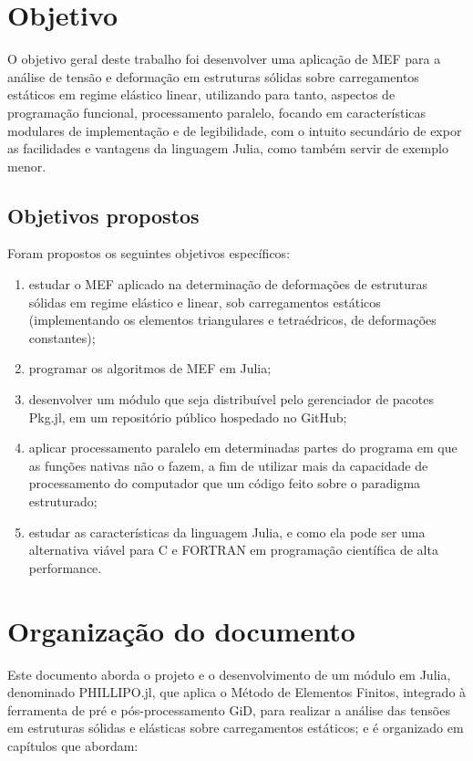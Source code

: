 \section{Objetivo}

O objetivo geral deste trabalho foi desenvolver uma aplicação de MEF para a análise de tensão e deformação em estruturas sólidas sobre carregamentos estáticos em regime elástico linear, utilizando para tanto, aspectos de programação funcional, processamento paralelo, focando em características modulares de implementação e de legibilidade, com o intuito secundário de expor as facilidades e vantagens da linguagem Julia, como também servir de exemplo menor.

\subsection{Objetivos propostos}

Foram propostos os seguintes objetivos específicos:

\begin{enumerate}
    \item estudar o MEF aplicado na determinação de deformações de estruturas sólidas em regime elástico e linear, sob carregamentos estáticos (implementando os elementos triangulares e tetraédricos, de deformações constantes);
    \item programar os algoritmos de MEF em Julia;
    \item desenvolver um módulo que seja distribuível pelo gerenciador de pacotes Pkg.jl, em um repositório público hospedado no GitHub;
    \item aplicar processamento paralelo em determinadas partes do programa em que as funções nativas não o fazem, a fim de utilizar mais da capacidade de processamento do computador que um código feito sobre o paradigma estruturado;
    \item estudar as características da linguagem Julia, e como ela pode ser uma alternativa viável para C e FORTRAN em programação científica de alta performance.
\end{enumerate}

\section{Organização do documento}

Este documento aborda o projeto e o desenvolvimento de um módulo em Julia, denominado PHILLIPO.jl, que aplica o Método de Elementos Finitos, integrado à ferramenta de pré e pós-processamento GiD, para realizar a análise das tensões em estruturas sólidas e elásticas sobre carregamentos estáticos; e é organizado em capítulos que abordam:

